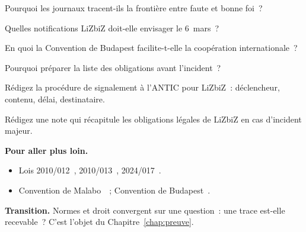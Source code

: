 \begin{boxexo}[title={\ding{45}\quad Exercice~9.5. Preuve de diligence \niveaumoyen}]
Pourquoi les journaux tracent-ils la frontière entre faute et bonne foi~?
\end{boxexo}

\begin{boxexo}[title={\ding{45}\quad Exercice~9.6. Notifications \niveaumoyen}]
Quelles notifications LiZbiZ doit-elle envisager le 6~mars~?
\end{boxexo}

\begin{boxexo}[title={\ding{45}\quad Exercice~9.7. Budapest \niveaumoyen}]
En quoi la Convention de Budapest facilite-t-elle la coopération
internationale~?
\end{boxexo}

\begin{boxexo}[title={\ding{45}\quad Exercice~9.8. À froid \niveaumoyen}]
Pourquoi préparer la liste des obligations avant l'incident~?
\end{boxexo}

\begin{boxexo}[title={\ding{45}\quad Exercice~9.9. Procédure de signalement \niveauexpert}]
Rédigez la procédure de signalement à l'ANTIC pour LiZbiZ~: déclencheur,
contenu, délai, destinataire.
\end{boxexo}

\begin{boxexo}[title={\ding{45}\quad Exercice~9.10. Note juridique \niveauexpert}]
Rédigez une note qui récapitule les obligations légales de LiZbiZ en cas
d'incident majeur.
\end{boxexo}

\bigskip

\begin{boxinfo}
\textbf{Pour aller plus loin.}
\begin{itemize}
    \item Lois 2010/012~\cite{loi2010012}, 2010/013~\cite{loi2010013},
          2024/017~\cite{loi2024017}.
    \item Convention de Malabo~\cite{malabo2014}~; Convention de
          Budapest~\cite{budapest2001}.
\end{itemize}
\end{boxinfo}

\begin{boxinfo}
\textbf{Transition.} Normes et droit convergent sur une question~: une trace
est-elle recevable~? C'est l'objet du Chapitre~\ref{chap:preuve}.
\end{boxinfo}
